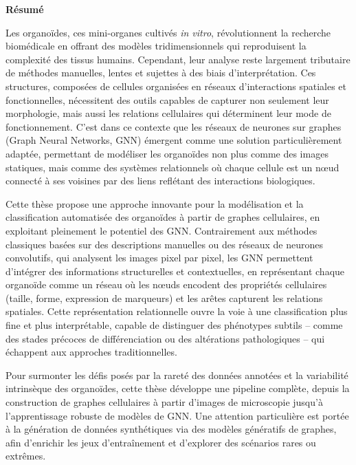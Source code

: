 
\clearpage
\thispagestyle{empty}
\vspace*{-2cm}

\begin{center}
{\large\bfseries Résumé}\par
\vspace{0.4cm}
\end{center}

Les organoïdes, ces mini-organes cultivés \textit{in vitro}, révolutionnent la recherche biomédicale en offrant des modèles tridimensionnels qui reproduisent la complexité des tissus humains. Cependant, leur analyse reste largement tributaire de méthodes manuelles, lentes et sujettes à des biais d'interprétation. Ces structures, composées de cellules organisées en réseaux d'interactions spatiales et fonctionnelles, nécessitent des outils capables de capturer non seulement leur morphologie, mais aussi les relations cellulaires qui déterminent leur mode de fonctionnement. C'est dans ce contexte que les réseaux de neurones sur graphes (Graph Neural Networks, GNN) émergent comme une solution particulièrement adaptée, permettant de modéliser les organoïdes non plus comme des images statiques, mais comme des systèmes relationnels où chaque cellule est un nœud connecté à ses voisines par des liens reflétant des interactions biologiques.

Cette thèse propose une approche innovante pour la modélisation et la classification automatisée des organoïdes à partir de graphes cellulaires, en exploitant pleinement le potentiel des GNN. Contrairement aux méthodes classiques basées sur des descriptions manuelles ou des réseaux de neurones convolutifs, qui analysent les images pixel par pixel, les GNN permettent d'intégrer des informations structurelles et contextuelles, en représentant chaque organoïde comme un réseau où les nœuds encodent des propriétés cellulaires (taille, forme, expression de marqueurs) et les arêtes capturent les relations spatiales. Cette représentation relationnelle ouvre la voie à une classification plus fine et plus interprétable, capable de distinguer des phénotypes subtils – comme des stades précoces de différenciation ou des altérations pathologiques – qui échappent aux approches traditionnelles.

Pour surmonter les défis posés par la rareté des données annotées et la variabilité intrinsèque des organoïdes, cette thèse développe une pipeline complète, depuis la construction de graphes cellulaires à partir d'images de microscopie jusqu'à l'apprentissage robuste de modèles de GNN. Une attention particulière est portée à la génération de données synthétiques via des modèles génératifs de graphes, afin d'enrichir les jeux d'entraînement et d'explorer des scénarios rares ou extrêmes. 


